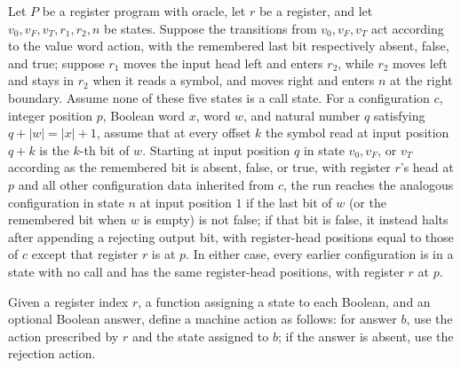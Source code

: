 \begin{lemma}
\label{Complexity.LogProg.valWord_run}
\leanok
{}
Let $P$ be a register program with oracle, let $r$ be a register, and let
$v_0,v_F,v_T,r_1,r_2,n$ be states. Suppose the transitions from $v_0,v_F,v_T$ act
according to the value word action, with the remembered last bit respectively absent,
false, and true; suppose $r_1$ moves the input head left and enters $r_2$, while $r_2$
moves left and stays in $r_2$ when it reads a symbol, and moves right and enters $n$ at
the right boundary. Assume none of these five states is a call state. For a
configuration $c$, integer position $p$, Boolean word $x$, word $w$, and natural number
$q$ satisfying $q+|w|=|x|+1$, assume that at every offset $k$ the symbol read at input
position $q+k$ is the $k$-th bit of $w$. Starting at input position $q$ in state
$v_0,v_F$, or $v_T$ according as the remembered bit is absent, false, or true, with
register $r$'s head at $p$ and all other configuration data inherited from $c$, the run
reaches the analogous configuration in state $n$ at input position $1$ if the last bit
of $w$ (or the remembered bit when $w$ is empty) is not false; if that bit is false, it
instead halts after appending a rejecting output bit, with register-head positions equal
to those of $c$ except that register $r$ is at $p$. In either case, every earlier
configuration is in a state with no call and has the same register-head positions, with
register $r$ at $p$.
\end{lemma}

\begin{definition}
\label{Complexity.LogProg.valP1Act}
\leanok
{}
Given a register index $r$, a function assigning a state to each Boolean, and an
optional Boolean answer, define a machine action as follows: for answer $b$, use the
action prescribed by $r$ and the state assigned to $b$; if the answer is absent, use the
rejection action.
\end{definition}

